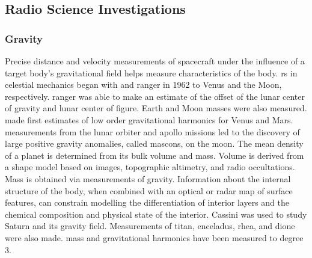 \documentclass{article}
\begin{document}
        \subsection{Radio Science Investigations}
                \subsubsection{Gravity}
                    Precise distance and velocity measurements of
                    spacecraft under the influence of a target body's
                    \gls{gravitational field} helps measure
                    characteristics of the body. \gls{rs} in
                    celestial mechanics began with
                     and \gls{ranger}
                    in 1962 to Venus and the Moon, respectively.
                    \gls{ranger} was able to make an estimate of
                    the offset of the lunar \gls{center of gravity}
                    and lunar \gls{center of figure}.
                    Earth and Moon masses were also measured.
                    made first estimates of low order gravitational
                    harmonics for Venus and Mars.
                     measurements
                    from the \gls{lunar orbiter} and
                    \gls{apollo} missions led to the discovery of
                    large positive gravity anomalies, called
                    \glspl{mascon}, on the moon. The mean density
                    of a planet is determined from its bulk volume
                    and mass. Volume is derived from a shape model
                    based on images, topographic \gls{altimetry},
                    and radio \glspl{occultation}. Mass is obtained
                    via measurements of gravity. Information about
                    the internal structure of the body, when combined
                    with an optical or radar map of surface features,
                    can constrain modelling the differentiation of
                    interior layers and the chemical composition and
                    physical state of the interior. Cassini was used
                    to study Saturn and its gravity field.
                    Measurements of \gls{titan}, \gls{enceladus},
                    \gls{rhea}, and \gls{dione} were also made.
                     mass and
                    \gls{gravitational harmonics} have been measured
                    to degree $3$. 
\end{document}
